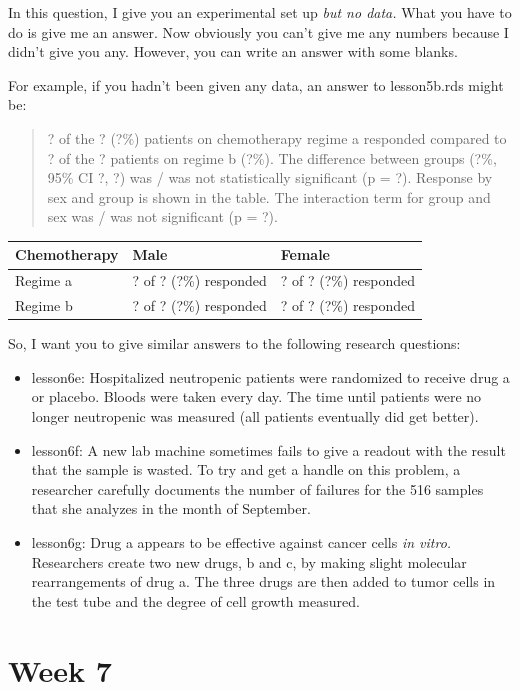 \documentclass[]{book}
\begin{document}
In this question, I give you an experimental set up \emph{but no data.} What you have to do is give me an answer. Now obviously you can't give me any numbers because I didn't give you any. However, you can write an answer with some blanks.

For example, if you hadn't been given any data, an answer to lesson5b.rds might be:

\begin{quote}
? of the ? (?\%) patients on chemotherapy regime a responded compared to ? of the ? patients on regime b (?\%). The difference between groups (?\%, 95\% CI ?, ?) was / was not statistically significant (p = ?). Response by sex and group is shown in the table. The interaction term for group and sex was / was not significant (p = ?).
\end{quote}

\captionsetup[table]{labelformat=empty,skip=1pt}
\begin{longtable}{lll}
\toprule
Chemotherapy & Male & Female \\ 
\midrule
Regime a & ? of ? (?\%) responded & ? of ? (?\%) responded \\ 
Regime b & ? of ? (?\%) responded & ? of ? (?\%) responded \\ 
\bottomrule
\end{longtable}

So, I want you to give similar answers to the following research questions:

\begin{itemize}
\item
  lesson6e: Hospitalized neutropenic patients were randomized to receive drug a or placebo. Bloods were taken every day. The time until patients were no longer neutropenic was measured (all patients eventually did get better).
\item
  lesson6f: A new lab machine sometimes fails to give a readout with the result that the sample is wasted. To try and get a handle on this problem, a researcher carefully documents the number of failures for the 516 samples that she analyzes in the month of September.
\item
  lesson6g: Drug a appears to be effective against cancer cells \emph{in vitro.} Researchers create two new drugs, b and c, by making slight molecular rearrangements of drug a. The three drugs are then added to tumor cells in the test tube and the degree of cell growth measured.
\end{itemize}

\hypertarget{week-7}{%
\chapter{Week 7}\label{week-7}}
\end{document}
